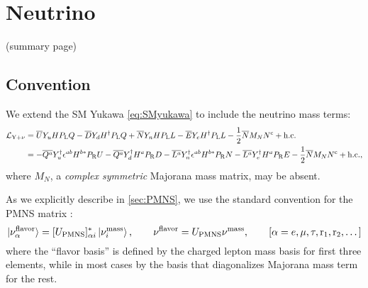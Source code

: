 \documentclass[CheatSheet]{subfiles}
\newcommand\MN[1][]{M_{N#1}}
\begin{document}
\summarystyle
\section{Neutrino}

(summary page)

\detailstyle
\clearpage
\subsection{Convention}
We extend the SM Yukawa \eqref{eq:SMyukawa} to include the neutrino mass terms:
\begin{align}
   \mathcal L\w{Y+\nu}&=
  \overline{U}\Yu H \PL Q
- \overline{D}\Yd H^\dagger \PL Q
+ \overline{N}\Yn H \PL L
- \overline{E}\Ye H^\dagger \PL L
- \frac{1}{2}\overline{N}\MN N^\cc
+ \text{h.c.}
\\&=
- \overline{Q^a}\Yu^\dagger \epsilon^{ab}H^{b*} \PR U
- \overline{Q^a}\Yd^\dagger H^{a} \PR D
- \overline{L^a}\Yn^\dagger \epsilon^{ab}H^{b*} \PR N
- \overline{L^a}\Ye^\dagger H^{a} \PR E
- \frac{1}{2}\overline{N}\MN N^\cc + \text{h.c.},
\end{align}
where $\MN$, a \emph{complex symmetric} Majorana mass matrix, may be absent.

As we explicitly describe in \cref{sec:PMNS}, we use the standard convention for the PMNS matrix :
\begin{equation}
 \ket{\nu_\alpha^{\text{flavor}}} = [U_{\mathrm{PMNS}}]_{\alpha i}^*\ket{\nu_i^{\text{mass}}},
\qquad
 \nu^\text{flavor} = U_{\mathrm{PMNS}}\nu^{\text{mass}}, \qquad[\alpha=e,\mu,\tau,\mathrm{r}_1,\mathrm{r}_2,\dots]\label{eq:PMNS-defining}
\end{equation}
where the ``flavor basis'' is defined by the charged lepton mass basis for first three elements, while in most cases by the basis that diagonalizes Majorana mass term for the rest.
\end{document}
